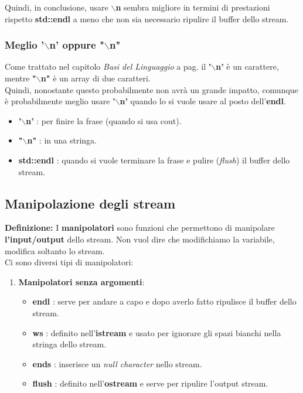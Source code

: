 \textsf{\small Quindi, in conclusione, usare \textbf{$\backslash$n} sembra migliore in termini di prestazioni rispetto \textbf{std::endl} a meno che non sia necessario ripulire il buffer dello stream.} \break

\subsubsection{Meglio '$\backslash$n' oppure "$\backslash$n"}

\textsf{\small Come trattato nel capitolo \emph{Basi del Linguaggio} a pag.\textbf{\pageref{newline_apici_o_virgolette}} il \textbf{'$\backslash$n'} è un carattere, mentre \textbf{"$\backslash$n"} è un array di due caratteri. } \\

\textsf{\small Quindi, nonostante questo probabilmente non avrà un grande impatto, comunque è probabilmente meglio usare \textbf{'$\backslash$n'} quando lo si vuole usare al posto dell'\textbf{endl}.} \\

\begin{itemize}
	\item \textsf{\small \textbf{'$\backslash$n'} : per finire la frase (quando si usa cout).}
	\item \textsf{\small \textbf{"$\backslash$n"} : in una stringa.}
	\item \textsf{\small \textbf{std::endl} : quando si vuole terminare la frase e pulire (\emph{flush}) il buffer dello stream. }
\end{itemize}

\subsection{Manipolazione degli stream}

\textsf{\small \textbf{Definizione: } I \textbf{manipolatori} sono funzioni che permettono di manipolare \textbf{l'input/output} dello stream. Non vuol dire che modifichiamo la variabile, modifica soltanto lo stream.} \\

\textsf{\small Ci sono diversi tipi di manipolatori: } \\

\begin{enumerate}
	\item \textsf{\small \textbf{Manipolatori senza argomenti}: }
	\begin{itemize}
		\item \textsf{\small \textbf{endl} : serve per andare a capo e dopo averlo fatto ripulisce il buffer dello stream.}
		\item \textsf{\small \textbf{ws} : definito nell'\textbf{istream} e usato per ignorare gli spazi bianchi nella stringa dello stream.}
		\item \textsf{\small \textbf{ends} : inserisce un \emph{null character} nello stream.}
		\item \textsf{\small \textbf{flush} : definito nell'\textbf{ostream} e serve per ripulire l'output stream.}
	\end{itemize}
\end{enumerate}

